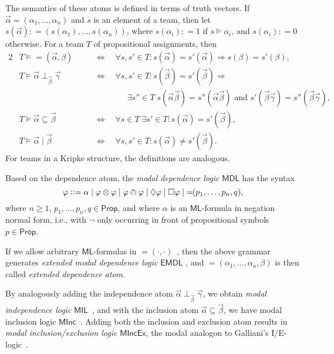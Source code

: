 \documentclass[a4paper,english,fleqn,11pt,final]{scrartcl}
\makeatletter
\newcommand{\ie}{i.e.\@\xspace}
\newcommand{\depop}{{=\!\!(\cdot,\cdot)}}
\newcommand{\dep}[1]{{=\!\!(#1)}}
\newcommand{\logic}[1]{\ensuremath{\mathsf{#1}}\xspace}
\newcommand{\PS}{\logic{Prop}}
\newcommand{\ML}{\logic{ML}}
\newcommand{\MDL}{\logic{MDL}}
\newcommand{\EMDL}{\logic{EMDL}}
\newcommand{\MINC}{\logic{MInc}}
\newcommand{\MINCEX}{\logic{MIncEx}}
\newcommand{\MIL}{\logic{MIL}}
\providecommand{\dfn}{\mathrel{\mathop:}=}
\providecommand{\ddfn}{\mathrel{\mathop{{\mathop:}{\mathop:}}}=}
\newcommand{\tens}{\otimes}
\newcommand{\oland}{\owedge}
\DeclareMathOperator{\indep}{\perp}
\theoremstyle{plain}
\theoremstyle{definition}
\makeatother
\begin{document}
\medskip

The semantics of these atoms is defined in terms of truth vectors.
If $\vec \alpha = (\alpha_1,\ldots,\alpha_n)$ and $s$ is an element of a team, then let $s(\vec \alpha) \dfn (s(\alpha_1),\ldots,s(\alpha_n))$, where $s(\alpha_i) \dfn 1$ if $s \vDash \alpha_i$, and $s(\alpha_i) \dfn 0$ otherwise.
For a team $T$ of propositional assignments, then
\begin{alignat*}{2}
    &T \vDash \dep{\vec\alpha,\beta} \quad && \Leftrightarrow \quad \forall s, s' \in T : s(\vec\alpha) = s'(\vec\alpha) \Rightarrow s(\beta) = s'(\beta),\\
    &T\vDash \vec\alpha \perp_{\vec \beta} \vec\gamma \quad  && \Leftrightarrow\quad  \forall s,s' \in T : s(\vec\beta) = s'(\vec\beta) \Rightarrow\\
    & && \qquad\qquad \exists s'' \in T \; s(\vec\alpha\vec\beta) = s''(\vec\alpha\vec\beta) \text{ and } s'(\vec\beta\vec\gamma) = s''(\vec\beta\vec\gamma),\\
    &T \vDash \vec\alpha \subseteq \vec \beta \quad && \Leftrightarrow \quad \forall s \in T \; \exists s' \in T : s(\vec\alpha) = s'(\vec\beta)\text{,}\\
    &T \vDash \vec\alpha \mid \vec \beta \quad && \Leftrightarrow \quad \forall s, s' \in T  : s(\vec\alpha) \neq s'(\vec\beta)\text{.}
\end{alignat*}
For teams in a Kripke structure, the definitions are analogous.

\medskip

Based on the dependence atom, the \emph{modal dependence logic} $\MDL$ \cite{vaananen_modal_2008} has the syntax
\[
\varphi \ddfn \alpha \mid \varphi \tens \varphi \mid \varphi \oland \varphi \mid \Diamond \varphi \mid \Box \varphi \mid \dep{p_1,\ldots,p_n,q}\text{,}
\]
where $n \geq 1$, $p_1,\ldots,p_n,q \in \PS$, and where $\alpha$ is an $\ML$-formula in negation normal form, \ie, with $\neg$ only occurring in front of propositional symbols $p \in \PS$.

If we allow arbitrary $\ML$-formulas in $\depop$~\cite{emdl}, then the above grammar generates \emph{extended modal dependence logic} $\EMDL$ \cite{emdl}, and $\dep{\alpha_1,\ldots,\alpha_n,\beta}$ is then called \emph{extended dependence atom}.

By analogously adding the independence atom $\vec{\alpha} \indep_{\vec{\beta}} \vec{\gamma}$, we obtain \emph{modal independence logic} $\MIL$~\cite{mind}, and with
the inclusion atom $\vec{\alpha} \subseteq \vec{\beta}$, we have modal inclusion logic $\MINC$~\cite{HellaS15}.
Adding both the inclusion and exclusion atom results in \emph{modal inclusion/exclusion logic} $\MINCEX$, the modal analogon to Galliani's I/E-logic~\cite{galliani_inclusion_2012}.
\end{document}
